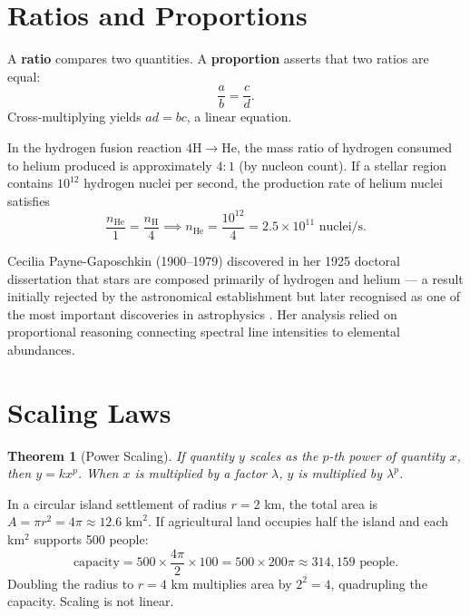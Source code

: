 \documentclass[11pt, openany]{book}
\theoremstyle{plain}
\newtheorem{theorem}{Theorem}[chapter]
\theoremstyle{definition}
\theoremstyle{remark}
\begin{document}
\section{Ratios and Proportions}

A \textbf{ratio} compares two quantities. A \textbf{proportion} asserts that
two ratios are equal:
\[
  \frac{a}{b}=\frac{c}{d}.
\]
Cross-multiplying yields $ad=bc$, a linear equation.

\begin{myexample}
In the hydrogen fusion reaction $4\mathrm{H}\to\mathrm{He}$, the mass ratio of
hydrogen consumed to helium produced is approximately $4:1$ (by nucleon count).
If a stellar region contains $10^{12}$ hydrogen nuclei per second, the
production rate of helium nuclei satisfies
\[
  \frac{n_\mathrm{He}}{1}=\frac{n_\mathrm{H}}{4}
  \implies n_\mathrm{He}=\frac{10^{12}}{4}=2.5\times10^{11}\text{ nuclei/s}.
\]
\end{myexample}

\begin{history}
Cecilia Payne-Gaposchkin (1900--1979) discovered in her 1925 doctoral
dissertation that stars are composed primarily of hydrogen and helium --- a
result initially rejected by the astronomical establishment but later
recognised as one of the most important discoveries in astrophysics
\citep{PayneGaposchkin1925}. Her analysis relied on proportional reasoning
connecting spectral line intensities to elemental abundances.
\end{history}

\section{Scaling Laws}

\begin{theorem}[Power Scaling]
If quantity $y$ scales as the $p$-th power of quantity $x$, then $y=kx^p$.
When $x$ is multiplied by a factor $\lambda$, $y$ is multiplied by $\lambda^p$.
\end{theorem}

\begin{myexample}
In a circular island settlement of radius $r=2$ km, the total area is
$A=\pi r^2=4\pi\approx12.6\;\text{km}^2$. If agricultural land occupies
half the island and each km$^2$ supports 500 people:
\[
  \text{capacity} = 500\times\frac{4\pi}{2}\times100
  = 500\times200\pi\approx314{,}159\text{ people}.
\]
Doubling the radius to $r=4$ km multiplies area by $2^2=4$, quadrupling the
capacity. Scaling is not linear.
\end{myexample}
\end{document}
